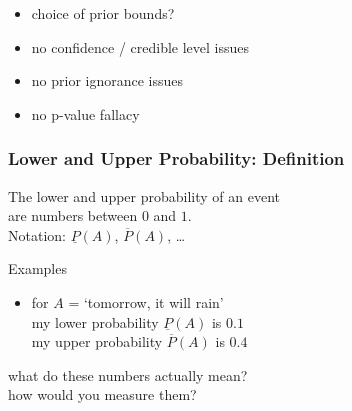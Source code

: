 \documentclass{beamer}
\newcommand{\lpr}{\underline{P}}
\newcommand{\upr}{\overline{P}}
\newcommand{\gplus}{\structure{\textbf{+}}}
\newcommand{\gmins}{\structure{\textbf{--}}}
\begin{document}
\begin{frame}
  \vspace*{1ex}
    \begin{itemize}
  \setlength{\itemsep}{0pt}
  \setlength{\parskip}{0pt}
  \setlength{\parsep}{0pt}
    \item[\gmins] choice of prior bounds?
    \item[\gplus] no confidence / credible level issues
    \item[\gplus] no prior ignorance issues
    \item[\gplus] no p-value fallacy
    \end{itemize}
\end{frame}

\begin{frame}
  \frametitle{Lower and Upper Probability: Definition}
  \begin{definition}
    The \alert{lower and upper probability of an event}\\ are numbers between $0$ and $1$.
    \\[1ex]
    Notation: $\lpr(A)$, $\upr(A)$, \dots
  \end{definition}
  \begin{exampleblock}{Examples}
    \begin{itemize}
    \item for $A$ = `tomorrow, it will rain' \\
      my lower probability $\lpr(A)$ is $0.1$ \\
      my upper probability $\upr(A)$ is $0.4$
    \end{itemize}
  \end{exampleblock}
  \begin{alertblock}{}
    what do these numbers actually mean? \\
    how would you measure them?
  \end{alertblock}
\end{frame}
\end{document}
